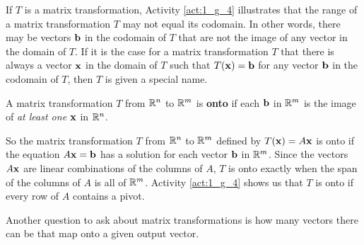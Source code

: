 If $T$ is a matrix transformation, Activity \ref{act:1_g_4} illustrates that the range of a matrix transformation $T$ may not equal its codomain. In other words, there may be vectors $\mathbf{b}$ in the codomain of $T$ that are not the image of any vector in the domain of $T$. If it is the case for a matrix transformation $T$ that there is always a vector $\mathbf{x}$ in the domain of $T$ such that $T(\mathbf{x}) = \mathbf{b}$ for any vector $\mathbf{b}$ in the codomain of $T$, then $T$ is given a special name.

\begin{definition} A matrix transformation $T$ from $\mathbb{R}^n$ to $\mathbb{R}^m$ is \textbf{onto} if each $\mathbf{b}$ in $\mathbb{R}^m$ is the image of \emph{at least one} $\mathbf{x}$ in $\mathbb{R}^n$.
\end{definition}   


So the matrix transformation $T$ from $\mathbb{R}^n$ to $\mathbb{R}^m$ defined by $T(\mathbf{x}) = A\mathbf{x}$ is onto if the equation $A \mathbf{x} = \mathbf{b}$ has a solution for each vector $\mathbf{b}$ in $\mathbb{R}^m$. Since the vectors $A\mathbf{x}$ are linear combinations of the columns of $A$, $T$ is onto exactly when the span of the columns of $A$ is all of $\mathbb{R}^m$. Activity \ref{act:1_g_4} shows us that $T$ is onto if every row of $A$ contains a pivot. 

Another question to ask about matrix transformations is how many vectors there can be that map onto a given output vector.


